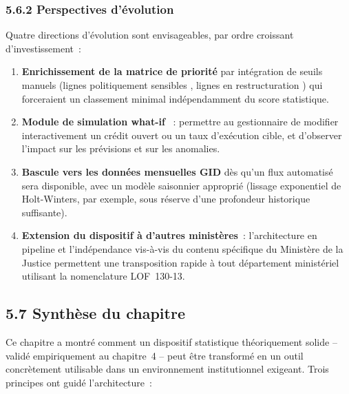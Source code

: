 \subsubsection*{5.6.2 \quad Perspectives d'\'evolution}

Quatre directions d'\'evolution sont envisageables, par ordre croissant
d'investissement~:

\begin{enumerate}
    \item \textbf{Enrichissement de la matrice de priorit\'e} par
    int\'egration de seuils manuels (\og lignes politiquement sensibles \fg{},
    \og lignes en restructuration \fg{}) qui forceraient un classement
    minimal ind\'ependamment du score statistique.
    \item \textbf{Module de simulation \og what-if \fg{}}~: permettre au
    gestionnaire de modifier interactivement un cr\'edit ouvert ou un
    taux d'ex\'ecution cible, et d'observer l'impact sur les pr\'evisions
    et sur les anomalies.
    \item \textbf{Bascule vers les donn\'ees mensuelles GID} d\`es qu'un
    flux automatis\'e sera disponible, avec un mod\`ele saisonnier
    appropri\'e (lissage exponentiel de Holt-Winters, par exemple, sous
    r\'eserve d'une profondeur historique suffisante).
    \item \textbf{Extension du dispositif \`a d'autres minist\`eres}~:
    l'architecture en pipeline et l'ind\'ependance vis-\`a-vis du contenu
    sp\'ecifique du Minist\`ere de la Justice permettent une transposition
    rapide \`a tout d\'epartement minist\'eriel utilisant la nomenclature
    LOF~130-13.
\end{enumerate}

\subsection*{5.7 \quad Synth\`ese du chapitre}

Ce chapitre a montr\'e comment un dispositif statistique th\'eoriquement
solide -- valid\'e empiriquement au chapitre~4 -- peut \^etre transform\'e
en un outil concr\`etement utilisable dans un environnement institutionnel
exigeant. Trois principes ont guid\'e l'architecture~:

